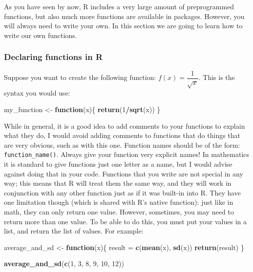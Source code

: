 \documentclass[]{gitbook}
\newenvironment{Shaded}{\begin{snugshade}}{\end{snugshade}}
\newcommand{\ControlFlowTok}[1]{\textcolor[rgb]{0.13,0.29,0.53}{\textbf{#1}}}
\newcommand{\DecValTok}[1]{\textcolor[rgb]{0.00,0.00,0.81}{#1}}
\newcommand{\KeywordTok}[1]{\textcolor[rgb]{0.13,0.29,0.53}{\textbf{#1}}}
\newcommand{\NormalTok}[1]{#1}
\newcommand{\OperatorTok}[1]{\textcolor[rgb]{0.81,0.36,0.00}{\textbf{#1}}}
\newcommand{\StringTok}[1]{\textcolor[rgb]{0.31,0.60,0.02}{#1}}
\theoremstyle{definition}
\theoremstyle{definition}
\theoremstyle{definition}
\theoremstyle{remark}
\begin{document}
As you have seen by now, R includes a very large amount of preprogrammed
functions, but also much more functions are available in packages.
However, you will always need to write your own. In this section we are
going to learn how to write our own functions.

\hypertarget{declaring-functions-in-r}{%
\subsubsection{Declaring functions in
R}\label{declaring-functions-in-r}}

Suppose you want to create the following function:
\(f(x) = \dfrac{1}{\sqrt{x}}\). This is the syntax you would use:

\begin{Shaded}
\begin{Highlighting}[]
\NormalTok{my_function <-}\StringTok{ }\ControlFlowTok{function}\NormalTok{(x)\{}
\KeywordTok{return}\NormalTok{(}\DecValTok{1}\OperatorTok{/}\KeywordTok{sqrt}\NormalTok{(x))}
\NormalTok{\}}
\end{Highlighting}
\end{Shaded}

While in general, it is a good idea to add comments to your functions to
explain what they do, I would avoid adding comments to functions that do
things that are very obvious, such as with this one. Function names
should be of the form: \texttt{function\_name()}. Always give your
function very explicit names! In mathematics it is standard to give
functions just one letter as a name, but I would advise against doing
that in your code. Functions that you write are not special in any way;
this means that R will treat them the same way, and they will work in
conjunction with any other function just as if it was built-in into R.
They have one limitation though (which is shared with R's native
function): just like in math, they can only return one value. However,
sometimes, you may need to return more than one value. To be able to do
this, you must put your values in a list, and return the list of values.
For example:

\begin{Shaded}
\begin{Highlighting}[]
\NormalTok{average_and_sd <-}\StringTok{ }\ControlFlowTok{function}\NormalTok{(x)\{}
\NormalTok{  result =}\StringTok{ }\KeywordTok{c}\NormalTok{(}\KeywordTok{mean}\NormalTok{(x), }\KeywordTok{sd}\NormalTok{(x))}
\KeywordTok{return}\NormalTok{(result)}
\NormalTok{\}}

\KeywordTok{average_and_sd}\NormalTok{(}\KeywordTok{c}\NormalTok{(}\DecValTok{1}\NormalTok{, }\DecValTok{3}\NormalTok{, }\DecValTok{8}\NormalTok{, }\DecValTok{9}\NormalTok{, }\DecValTok{10}\NormalTok{, }\DecValTok{12}\NormalTok{))}
\end{Highlighting}
\end{Shaded}
\end{document}
